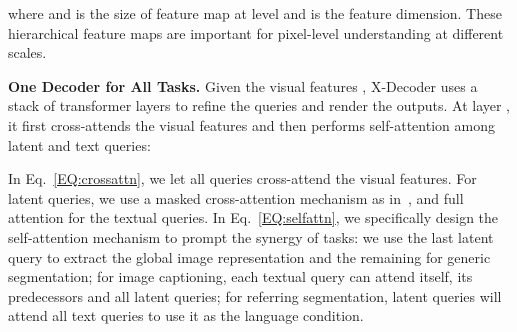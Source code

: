 \documentclass[10pt,twocolumn,letterpaper]{article}
\newcommand{\ourmodel}{X-Decoder}
\begin{document}
where  and  is the size of feature map at level  and  is the feature dimension. These hierarchical feature maps are important for pixel-level understanding at different scales.

\smallskip\noindent\textbf{One Decoder  for All Tasks.} Given the visual features , \ourmodel{} uses a stack of transformer layers to refine the queries and render the outputs. At layer , it first cross-attends the visual features and then performs self-attention among latent and text queries:


In Eq.~\eqref{EQ:crossattn}, we let all queries cross-attend the visual features. For latent queries, we use a masked cross-attention mechanism as in~\cite{cheng2022masked}, and full attention for the textual queries. In Eq.~\eqref{EQ:selfattn}, we specifically design the self-attention mechanism to prompt the synergy of tasks:  we use the last latent query to extract the global image representation and the remaining for generic segmentation;  for image captioning, each textual query can attend itself, its predecessors and all latent queries;  for referring segmentation, latent queries will attend all text queries to use it as the language condition. 
\end{document}
